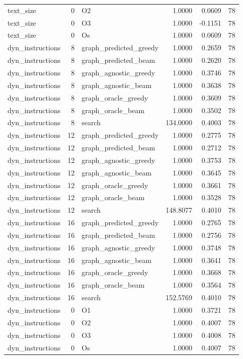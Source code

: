 \begin{table}[t]
\begin{tabular}{lrlrrr}
text\_size & 0 & O2 & 1.0000 & 0.0609 & 78 \\
text\_size & 0 & O3 & 1.0000 & -0.1151 & 78 \\
text\_size & 0 & Os & 1.0000 & 0.0609 & 78 \\
dyn\_instructions & 8 & graph\_predicted\_greedy & 1.0000 & 0.2659 & 78 \\
dyn\_instructions & 8 & graph\_predicted\_beam & 1.0000 & 0.2620 & 78 \\
dyn\_instructions & 8 & graph\_agnostic\_greedy & 1.0000 & 0.3746 & 78 \\
dyn\_instructions & 8 & graph\_agnostic\_beam & 1.0000 & 0.3638 & 78 \\
dyn\_instructions & 8 & graph\_oracle\_greedy & 1.0000 & 0.3609 & 78 \\
dyn\_instructions & 8 & graph\_oracle\_beam & 1.0000 & 0.3502 & 78 \\
dyn\_instructions & 8 & search & 134.0000 & 0.4003 & 78 \\
dyn\_instructions & 12 & graph\_predicted\_greedy & 1.0000 & 0.2775 & 78 \\
dyn\_instructions & 12 & graph\_predicted\_beam & 1.0000 & 0.2712 & 78 \\
dyn\_instructions & 12 & graph\_agnostic\_greedy & 1.0000 & 0.3753 & 78 \\
dyn\_instructions & 12 & graph\_agnostic\_beam & 1.0000 & 0.3645 & 78 \\
dyn\_instructions & 12 & graph\_oracle\_greedy & 1.0000 & 0.3661 & 78 \\
dyn\_instructions & 12 & graph\_oracle\_beam & 1.0000 & 0.3528 & 78 \\
dyn\_instructions & 12 & search & 148.8077 & 0.4010 & 78 \\
dyn\_instructions & 16 & graph\_predicted\_greedy & 1.0000 & 0.2765 & 78 \\
dyn\_instructions & 16 & graph\_predicted\_beam & 1.0000 & 0.2756 & 78 \\
dyn\_instructions & 16 & graph\_agnostic\_greedy & 1.0000 & 0.3748 & 78 \\
dyn\_instructions & 16 & graph\_agnostic\_beam & 1.0000 & 0.3641 & 78 \\
dyn\_instructions & 16 & graph\_oracle\_greedy & 1.0000 & 0.3668 & 78 \\
dyn\_instructions & 16 & graph\_oracle\_beam & 1.0000 & 0.3564 & 78 \\
dyn\_instructions & 16 & search & 152.5769 & 0.4010 & 78 \\
dyn\_instructions & 0 & O1 & 1.0000 & 0.3721 & 78 \\
dyn\_instructions & 0 & O2 & 1.0000 & 0.4007 & 78 \\
dyn\_instructions & 0 & O3 & 1.0000 & 0.4008 & 78 \\
dyn\_instructions & 0 & Os & 1.0000 & 0.4007 & 78 \\
\bottomrule
\end{tabular}
\end{table}

